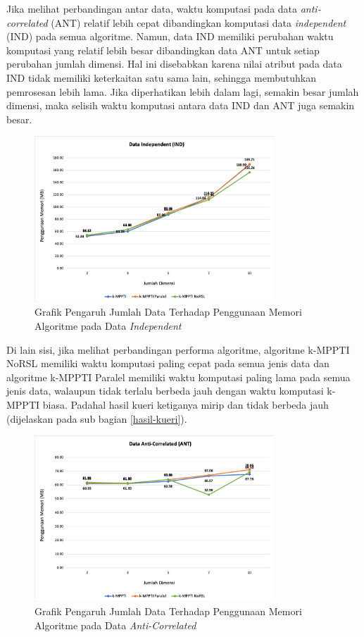 Jika melihat perbandingan antar data, waktu komputasi pada data \textit{anti-correlated} (ANT) relatif lebih cepat dibandingkan komputasi data \textit{independent} (IND) pada semua algoritme. Namun, data IND memiliki perubahan waktu komputasi yang relatif lebih besar dibandingkan data ANT untuk setiap perubahan jumlah dimensi. Hal ini disebabkan karena nilai atribut pada data IND tidak memiliki keterkaitan satu sama lain, sehingga membutuhkan pemrosesan lebih lama. Jika diperhatikan lebih dalam lagi, semakin besar jumlah dimensi, maka selisih waktu komputasi antara data IND dan ANT juga semakin besar.

\begin{figure}[H]
	\centering
	\includegraphics[width=9cm]{assets/img/bab5/grafik-ind-dim-mem.png}
	\caption{Grafik Pengaruh Jumlah Data Terhadap Penggunaan Memori Algoritme pada Data \textit{Independent}}
	\label{fig:grafik-ind-dim-mem}
\end{figure}

Di lain sisi, jika melihat perbandingan performa algoritme, algoritme k-MPPTI NoRSL memiliki waktu komputasi paling cepat pada semua jenis data dan algoritme k-MPPTI Paralel memiliki waktu komputasi paling lama pada semua jenis data, walaupun tidak terlalu berbeda jauh dengan waktu komputasi k-MPPTI biasa. Padahal hasil kueri ketiganya mirip dan tidak berbeda jauh (dijelaskan pada sub bagian \ref{hasil-kueri}).

\begin{figure}[H]
	\centering
	\includegraphics[width=9cm]{assets/img/bab5/grafik-ant-dim-mem.png}
	\caption{Grafik Pengaruh Jumlah Data Terhadap Penggunaan Memori Algoritme pada Data \textit{Anti-Correlated}}
	\label{fig:grafik-ant-dim-mem}
\end{figure}

